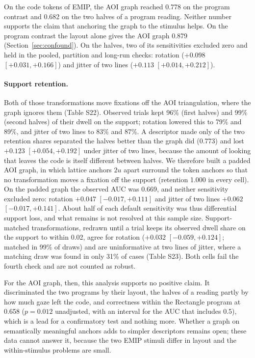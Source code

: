 On the code tokens of EMIP, the AOI graph reached 0.778 on the program contrast and 0.682 on the two halves of a program reading. Neither number supports the claim that anchoring the graph to the stimulus helps. On the program contrast the layout alone gives the AOI graph 0.879 (Section~\ref{sec:confound}). On the halves, two of its sensitivities excluded zero and held in the pooled, partition and long-run checks: rotation ($+0.098$ $[+0.031, +0.166]$) and jitter of two lines ($+0.113$ $[+0.014, +0.212]$).

\paragraph{Support retention.}\label{sec:support} Both of those transformations move fixations off the AOI triangulation, where the graph ignores them (Table S22). Observed trials kept 96\% (first halves) and 99\% (second halves) of their dwell on the support; rotation lowered this to 79\% and 89\%, and jitter of two lines to 83\% and 87\%. A descriptor made only of the two retention shares separated the halves better than the graph did (0.773) and lost $+0.123$ $[+0.054, +0.192]$ under jitter of two lines, because the amount of looking that leaves the code is itself different between halves. We therefore built a padded AOI graph, in which lattice anchors $2u$ apart surround the token anchors so that no transformation moves a fixation off the support (retention 1.000 in every cell). On the padded graph the observed AUC was 0.669, and neither sensitivity excluded zero: rotation $+0.047$ $[-0.017, +0.111]$ and jitter of two lines $+0.062$ $[-0.017, +0.141]$. About half of each default sensitivity was thus differential support loss, and what remains is not resolved at this sample size. Support-matched transformations, redrawn until a trial keeps its observed dwell share on the support to within 0.02, agree for rotation ($+0.032$ $[-0.059, +0.124]$; matched in 99\% of draws) and are uninformative at two lines of jitter, where a matching draw was found in only 31\% of cases (Table S23). Both cells fail the fourth check and are not counted as robust.

For the AOI graph, then, this analysis supports no positive claim. It discriminated the two programs by their layout, the halves of a reading partly by how much gaze left the code, and correctness within the Rectangle program at 0.658 ($p = 0.012$ unadjusted, with an interval for the AUC that includes 0.5), which is a lead for a confirmatory test and nothing more. Whether a graph on semantically meaningful anchors adds to simpler descriptors remains open; these data cannot answer it, because the two EMIP stimuli differ in layout and the within-stimulus problems are small.

